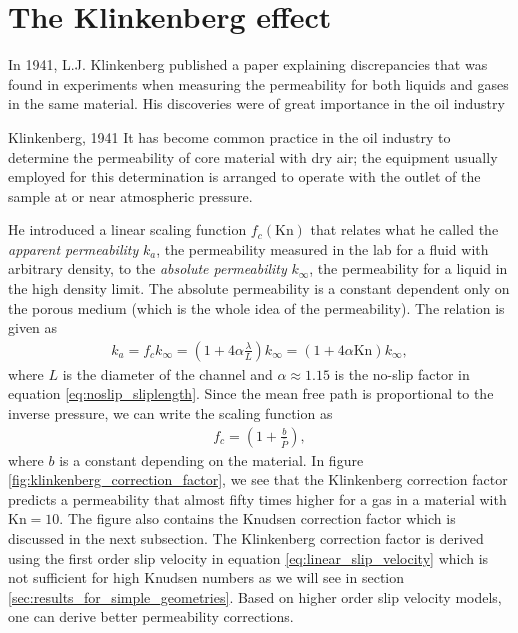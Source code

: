 \section{The Klinkenberg effect}

In 1941, L.J. Klinkenberg published a paper explaining discrepancies that was found in experiments when measuring the permeability for both liquids and gases in the same material\cite{klinkenberg1941permeability}. His discoveries were of great importance in the oil industry
\begin{aquote}{Klinkenberg, 1941}
	It has become common practice in the oil industry to determine the permeability of core material with dry air; the equipment usually employed for this determination is arranged to operate with the outlet of the sample at or near atmospheric pressure.
\end{aquote}
He introduced a linear scaling function $f_c(\text{Kn})$ that relates what he called the \textit{apparent permeability} $k_a$, the permeability measured in the lab for a fluid with arbitrary density, to the \textit{absolute permeability} $k_\infty$, the permeability for a liquid in the high density limit. The absolute permeability is a constant dependent only on the porous medium (which is the whole idea of the permeability). The relation is given as
\begin{align}
	k_a = f_c k_\infty = \left(1 + 4\alpha\frac{\lambda}{L}\right)k_\infty = \left(1 + 4\alpha\text{Kn}\right)k_\infty,
\end{align}
where $L$ is the diameter of the channel and $\alpha\approx 1.15$ is the no-slip factor in equation \eqref{eq:noslip_sliplength}. Since the mean free path is proportional to the inverse pressure, we can write the scaling function as
\begin{align}
	f_c = \left(1 + \frac{b}{\bar P}\right),
\end{align}
where $b$ is a constant depending on the material. In figure \ref{fig:klinkenberg_correction_factor}, we see that the Klinkenberg correction factor predicts a permeability that almost fifty times higher for a gas in a material with $\text{Kn}=10$. The figure also contains the Knudsen correction factor which is discussed in the next subsection. The Klinkenberg correction factor is derived using the first order slip velocity in equation \eqref{eq:linear_slip_velocity} which is not sufficient for high Knudsen numbers as we will see in section \ref{sec:results_for_simple_geometries}. Based on higher order slip velocity models, one can derive better permeability corrections. 
